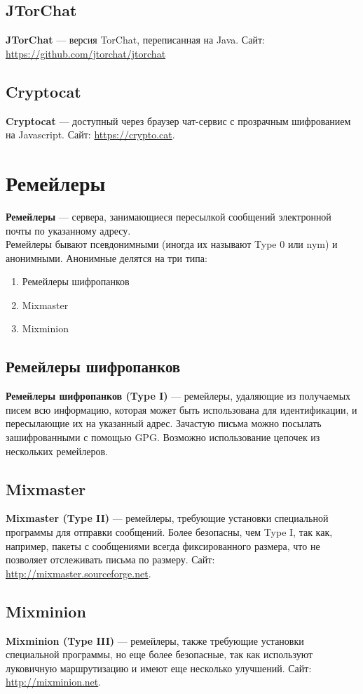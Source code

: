 \subsection{JTorChat}
\textbf{JTorChat} --- версия TorChat, переписанная на Java. Сайт: \url{https://github.com/jtorchat/jtorchat}
\subsection{Cryptocat}
\textbf{Cryptocat} --- доступный через браузер чат-сервис с прозрачным шифрованием на Javascript. Сайт: \url{https://crypto.cat}.

\section{Ремейлеры}
\textbf{Ремейлеры} --- сервера, занимающиеся пересылкой сообщений электронной почты по указанному адресу.\\
Ремейлеры бывают псевдонимными (иногда их называют Type 0 или nym) и анонимными. Анонимные делятся на три типа:
\begin{enumerate}
\item Ремейлеры шифропанков
\item Mixmaster 
\item Mixminion
\end{enumerate}
\subsection{Ремейлеры шифропанков}
\textbf{Ремейлеры шифропанков (Type I)} --- ремейлеры, удаляющие из получаемых писем всю информацию, которая может быть использована для идентификации, и пересылающие их на указанный адрес. Зачастую письма можно посылать зашифрованными с помощью GPG. Возможно использование цепочек из нескольких ремейлеров.
\subsection{Mixmaster}
\textbf{Mixmaster (Type II)} --- ремейлеры, требующие установки специальной программы для отправки сообщений. Более безопасны, чем Type I, так как, например, пакеты с сообщениями всегда фиксированного размера, что не позволяет отслеживать письма по размеру. Сайт: \url{http://mixmaster.sourceforge.net}.
\subsection{Mixminion}
\textbf{Mixminion (Type III)} --- ремейлеры, также требующие установки специальной программы, но еще более безопасные, так как используют луковичную маршрутизацию и имеют еще несколько улучшений. Сайт: \url{http://mixminion.net}.

